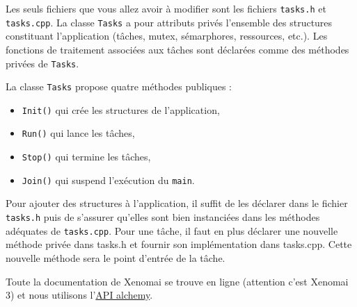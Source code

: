 \documentclass[11pt]{paper}
\begin{document}
 Les seuls fichiers que vous allez avoir à modifier sont les fichiers {\tt tasks.h} et {\tt tasks.cpp}. La classe {\tt Tasks} a pour attributs privés l'ensemble des structures constituant l'application (tâches, mutex, sémarphores, ressources, etc.). Les fonctions de traitement associées aux tâches sont déclarées comme des méthodes privées de {\tt Tasks}.
 
 La classe {\tt Tasks} propose quatre méthodes publiques :
 \begin{itemize}
 	\item {\tt Init()} qui crée les structures de l'application,
	\item {\tt Run()} qui lance les tâches,
	\item {\tt Stop()} qui termine les tâches,
	\item {\tt Join()} qui suspend l'exécution du {\tt main}.\\
 \end{itemize}

Pour ajouter des structures à l'application, il suffit de les déclarer dans le fichier {\tt tasks.h} puis de s'assurer qu'elles sont bien instanciées dans les méthodes adéquates de {\tt tasks.cpp}. Pour une tâche, il faut en plus déclarer une nouvelle méthode privée dans {tasks.h} et fournir son implémentation dans {tasks.cpp}. Cette nouvelle méthode sera le point d'entrée de la tâche.

Toute la documentation de Xenomai se trouve en ligne (attention c'est Xenomai 3) et nous utilisons l'\href{https://xenomai.org/documentation/xenomai-3/html/xeno3prm/group__alchemy.html}{API alchemy}.
\end{document}
